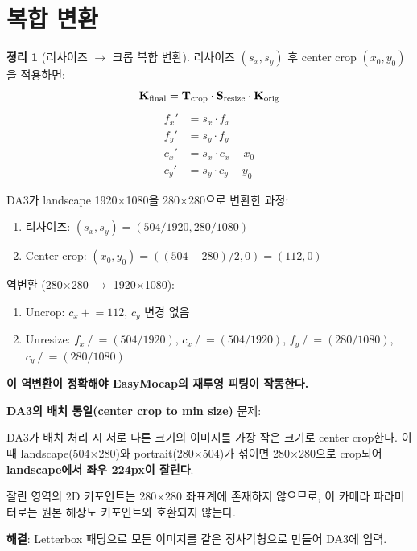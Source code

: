 \documentclass[11pt, a4paper]{report}
\theoremstyle{definition}
\newtheorem{theorem}{정리}[chapter]
\theoremstyle{remark}
\begin{document}
\section{복합 변환}

\begin{theorem}[리사이즈 $\rightarrow$ 크롭 복합 변환]
\label{thm:composite}
리사이즈 $(s_x, s_y)$ 후 center crop $(x_0, y_0)$을 적용하면:
\begin{equation}
\mathbf{K}_{\text{final}} = \mathbf{T}_{\text{crop}} \cdot \mathbf{S}_{\text{resize}} \cdot \mathbf{K}_{\text{orig}}
\end{equation}
\begin{equation}
\boxed{
\begin{aligned}
f_x' &= s_x \cdot f_x \\
f_y' &= s_y \cdot f_y \\
c_x' &= s_x \cdot c_x - x_0 \\
c_y' &= s_y \cdot c_y - y_0
\end{aligned}
}
\label{eq:composite}
\end{equation}
\end{theorem}

\begin{practicebox}[title={실전: DA3 280$\times$280의 역변환}]
DA3가 landscape 1920$\times$1080을 280$\times$280으로 변환한 과정:
\begin{enumerate}[nosep]
  \item 리사이즈: $(s_x, s_y) = (504/1920, 280/1080)$
  \item Center crop: $(x_0, y_0) = ((504-280)/2, 0) = (112, 0)$
\end{enumerate}

역변환 (280$\times$280 $\rightarrow$ 1920$\times$1080):
\begin{enumerate}[nosep]
  \item Uncrop: $c_x \mathrel{+}= 112$, $c_y$ 변경 없음
  \item Unresize: $f_x \mathrel{/}= (504/1920)$, $c_x \mathrel{/}= (504/1920)$, $f_y \mathrel{/}= (280/1080)$, $c_y \mathrel{/}= (280/1080)$
\end{enumerate}

\textbf{이 역변환이 정확해야 EasyMocap의 재투영 피팅이 작동한다.}
\end{practicebox}

\begin{warningbox}
\textbf{DA3의 배치 통일(center crop to min size)} 문제:

DA3가 배치 처리 시 서로 다른 크기의 이미지를 가장 작은 크기로 center crop한다.
이때 landscape(504$\times$280)와 portrait(280$\times$504)가 섞이면
280$\times$280으로 crop되어 \textbf{landscape에서 좌우 224px이 잘린다}.

잘린 영역의 2D 키포인트는 280$\times$280 좌표계에 존재하지 않으므로,
이 카메라 파라미터로는 원본 해상도 키포인트와 호환되지 않는다.

\textbf{해결}: Letterbox 패딩으로 모든 이미지를 같은 정사각형으로 만들어 DA3에 입력.
\end{warningbox}
\end{document}
